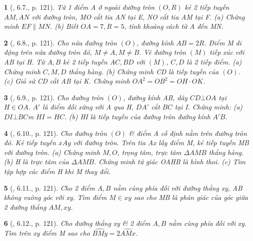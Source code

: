 \documentclass{article}
\newtheorem{baitoan}{}
\begin{document}
\begin{baitoan}[\cite{Binh_boi_duong_Toan_9_tap_1}, 6.7., p. 121]
	Từ 1 điểm A ở ngoài đường tròn $(O,R)$ kẻ 2 tiếp tuyến $AM,AN$ với đường tròn, MO cắt tia AN tại E, NO cắt tia AM tại F. (a) Chứng minh $EF\parallel MN$. (b) Biết $OA = 7,R = 5$, tính khoảng cách từ A đến MN.
\end{baitoan}

\begin{baitoan}[\cite{Binh_boi_duong_Toan_9_tap_1}, 6.8., p. 121]
	Cho nửa đường tròn $(O)$, đường kính $AB = 2R$. Điểm M di động trên nửa đường tròn đó, $M\ne A,M\ne B$. Vẽ đường tròn $(M)$ tiếp xúc với AB tại H. Từ $A,B$ kẻ 2 tiếp tuyến $AC,BD$ với $(M)$, $C,D$ là 2 tiếp điểm. (a) Chứng minh $C,M,D$ thẳng hàng. (b) Chứng minh CD là tiếp tuyến của $(O)$. (c) Giả sử CD cắt AB tại K. Chứng minh $OA^2 = OB^2 = OH\cdot OK$.
\end{baitoan}

\begin{baitoan}[\cite{Binh_boi_duong_Toan_9_tap_1}, 6.9., p. 121]
	Cho đường tròn $(O)$, đường kính AB, dây $CD\bot OA$ tại $H\in OA$. $A'$ là điểm đối xứng với A qua H, $DA'$ cắt $BC$ tại I. Chứng minh: (a) $DI\bot BC$m $HI = HC$. (b) HI là tiếp tuyến của đường tròn đường kính $A'B$.
\end{baitoan}

\begin{baitoan}[\cite{Binh_boi_duong_Toan_9_tap_1}, 6.10., p. 121]
	Cho đường tròn $(O)$ \& điểm A cố định nằm trên đường tròn đó. Kẻ tiếp tuyến $xAy$ với đường tròn. Trên tia Ax lấy điểm M, kẻ tiếp tuyến MB với đường tròn. (a) Chứng minh $M,O$, trọng tâm, trực tâm $\Delta AMB$ thẳng hàng. (b) H là trực tâm của $\Delta AMB$. Chứng minh tứ giác OAHB là hình thoi. (c) Tìm tập hợp các điểm H khi M thay đổi.
\end{baitoan}

\begin{baitoan}[\cite{Binh_boi_duong_Toan_9_tap_1}, 6.11., p. 121]
	Cho 2 điểm $A,B$ nằm cùng phía đối với đường thẳng xy, AB không vuông góc với xy. Tìm điểm $M\in xy$ sao cho MB là phân giác của góc giữa 2 đường thẳng $AM,xy$.
\end{baitoan}

\begin{baitoan}[\cite{Binh_boi_duong_Toan_9_tap_1}, 6.12., p. 121]
	Cho đường thẳng xy \& 2 điểm $A,B$ nằm cùng phía đối với xy. Tìm trên xy điểm M sao cho $\widehat{BMy} = 2\widehat{AMx}$.
\end{baitoan}
\end{document}
